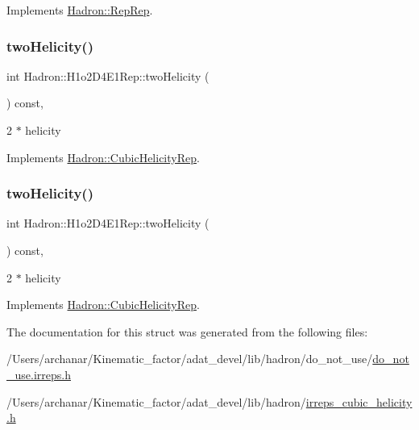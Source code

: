 Implements \mbox{\hyperlink{structHadron_1_1RepRep_ab3213025f6de249f7095892109575fde}{Hadron\+::\+Rep\+Rep}}.

\mbox{\label{structHadron_1_1H1o2D4E1Rep_aaf66515136803b1657682ffac0d07ce9}} 
\subsubsection{\texorpdfstring{twoHelicity()}{twoHelicity()}\hspace{0.1cm}{\footnotesize\ttfamily [1/2]}}
{\footnotesize\ttfamily int Hadron\+::\+H1o2\+D4\+E1\+Rep\+::two\+Helicity (\begin{DoxyParamCaption}{ }\end{DoxyParamCaption}) const\hspace{0.3cm}{\ttfamily [inline]}, {\ttfamily [virtual]}}

2 $\ast$ helicity 

Implements \mbox{\hyperlink{structHadron_1_1CubicHelicityRep_af507aa56fc2747eacc8cb6c96db31ecc}{Hadron\+::\+Cubic\+Helicity\+Rep}}.

\mbox{\label{structHadron_1_1H1o2D4E1Rep_aaf66515136803b1657682ffac0d07ce9}} 
\subsubsection{\texorpdfstring{twoHelicity()}{twoHelicity()}\hspace{0.1cm}{\footnotesize\ttfamily [2/2]}}
{\footnotesize\ttfamily int Hadron\+::\+H1o2\+D4\+E1\+Rep\+::two\+Helicity (\begin{DoxyParamCaption}{ }\end{DoxyParamCaption}) const\hspace{0.3cm}{\ttfamily [inline]}, {\ttfamily [virtual]}}

2 $\ast$ helicity 

Implements \mbox{\hyperlink{structHadron_1_1CubicHelicityRep_af507aa56fc2747eacc8cb6c96db31ecc}{Hadron\+::\+Cubic\+Helicity\+Rep}}.



The documentation for this struct was generated from the following files\+:\begin{DoxyCompactItemize}
\item 
/\+Users/archanar/\+Kinematic\+\_\+factor/adat\+\_\+devel/lib/hadron/do\+\_\+not\+\_\+use/\mbox{\hyperlink{do__not__use_8irreps_8h}{do\+\_\+not\+\_\+use.\+irreps.\+h}}\item 
/\+Users/archanar/\+Kinematic\+\_\+factor/adat\+\_\+devel/lib/hadron/\mbox{\hyperlink{lib_2hadron_2irreps__cubic__helicity_8h}{irreps\+\_\+cubic\+\_\+helicity.\+h}}\end{DoxyCompactItemize}
